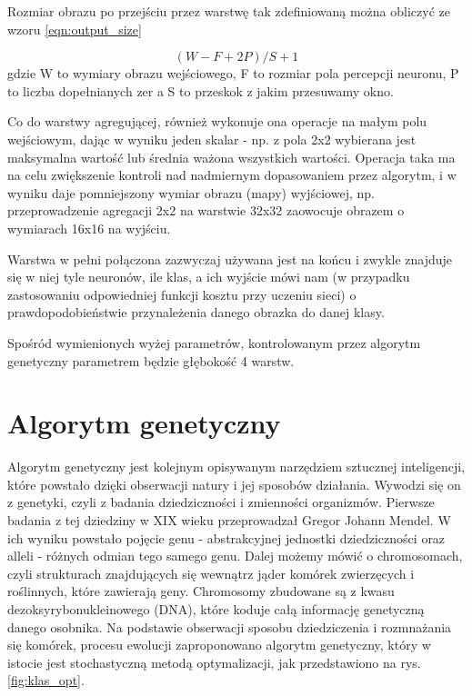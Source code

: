 Rozmiar obrazu po przejściu przez warstwę tak zdefiniowaną można obliczyć ze wzoru \ref{eqn:output_size}

\begin{equation}\label{eqn:output_size}
(W - F + 2P)/S + 1
\end{equation}
gdzie W to wymiary obrazu wejściowego, F to rozmiar pola percepcji neuronu, P to liczba dopełnianych zer a S to przeskok z jakim przesuwamy okno.

Co do warstwy agregującej, również wykonuje ona operacje na małym polu wejściowym, dając w wyniku jeden skalar - np. z pola 2x2 wybierana jest maksymalna wartość lub średnia ważona wszystkich wartości.
Operacja taka ma na celu zwiększenie kontroli nad nadmiernym dopasowaniem przez algorytm, i w wyniku daje pomniejszony wymiar obrazu (mapy) wyjściowej, np. przeprowadzenie agregacji 2x2 na warstwie 32x32 zaowocuje obrazem o wymiarach 16x16 na wyjściu.

Warstwa w pełni połączona zazwyczaj używana jest na końcu i zwykle znajduje się w niej tyle neuronów, ile klas, a ich wyjście mówi nam (w przypadku zastosowaniu odpowiedniej funkcji kosztu przy uczeniu sieci) o prawdopodobieństwie przynależenia danego obrazka do danej klasy.

Spośród wymienionych wyżej parametrów, kontrolowanym przez algorytm genetyczny parametrem będzie głębokość 4 warstw.

\section{Algorytm genetyczny}\label{sec:ag}

Algorytm genetyczny jest kolejnym opisywanym narzędziem sztucznej inteligencji, które powstało dzięki obserwacji natury i jej sposobów działania.
Wywodzi się on z genetyki, czyli z badania dziedziczności i zmienności organizmów.
Pierwsze badania z tej dziedziny w XIX wieku przeprowadzał Gregor Johann Mendel.
W ich wyniku powstało pojęcie genu - abstrakcyjnej jednostki dziedziczności oraz alleli - różnych odmian tego samego genu.
Dalej możemy mówić o chromosomach, czyli strukturach znajdujących się wewnątrz jąder komórek zwierzęcych i roślinnych, które zawierają geny.
Chromosomy zbudowane są z kwasu dezoksyrybonukleinowego (DNA), które koduje całą informację genetyczną danego osobnika.
Na podstawie obserwacji sposobu dziedziczenia i rozmnażania się komórek, procesu ewolucji zaproponowano algorytm genetyczny, który w istocie jest stochastyczną metodą optymalizacji, jak przedstawiono na rys. \ref{fig:klas_opt}.

